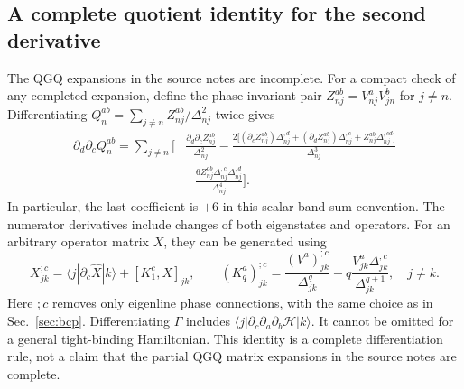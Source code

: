 \documentclass[prx,amsmath,amssymb,superscriptaddress,longbibliography]{revtex4-2}
\begin{document}
\subsection{A complete quotient identity for the second derivative}
The QGQ expansions in the source notes are incomplete.
For a compact check of any completed expansion, define the phase-invariant pair
$Z_{nj}^{ab}=V_{nj}^aV_{jn}^b$ for $j\ne n$.
Differentiating $Q_n^{ab}=\sum_{j\ne n}Z_{nj}^{ab}/\Delta_{nj}^2$ twice gives
\begin{align}
 \partial_d\partial_c Q_n^{ab}=\sum_{j\ne n}\bigg[
 &\frac{\partial_d\partial_c Z_{nj}^{ab}}{\Delta_{nj}^2}
 -\frac{2\big[(\partial_c Z_{nj}^{ab})\Delta_{nj}^{,d}
              +(\partial_d Z_{nj}^{ab})\Delta_{nj}^{,c}
              +Z_{nj}^{ab}\Delta_{nj}^{,cd}\big]}{\Delta_{nj}^3}
 \nonumber\\
 &+\frac{6Z_{nj}^{ab}\Delta_{nj}^{,c}\Delta_{nj}^{,d}}{\Delta_{nj}^4}\bigg].
 \label{eq:qgq-quotient}
\end{align}
In particular, the last coefficient is $+6$ in this scalar band-sum convention.
The numerator derivatives include changes of both eigenstates and operators.
For an arbitrary operator matrix $X$, they can be generated using
\begin{equation}
 X_{jk}^{;c}=\langle j|\partial_c\hat X|k\rangle+[K_1^c,X]_{jk},\qquad
 (K_q^a)_{jk}^{;c}=\frac{(V^a)_{jk}^{;c}}{\Delta_{jk}^q}
 -q\frac{V_{jk}^a\Delta_{jk}^{,c}}{\Delta_{jk}^{q+1}},\quad j\ne k.
 \label{eq:qgd-recursion}
\end{equation}
Here $;c$ removes only eigenline phase connections, with the same choice as in
Sec.~\ref{sec:bcp}. Differentiating $\Gamma$ includes
$\langle j|\partial_c\partial_a\partial_b\mathcal H|k\rangle$.
It cannot be omitted for a general tight-binding Hamiltonian.
This identity is a complete differentiation rule, not a claim that the
partial QGQ matrix expansions in the source notes are complete.
\end{document}
